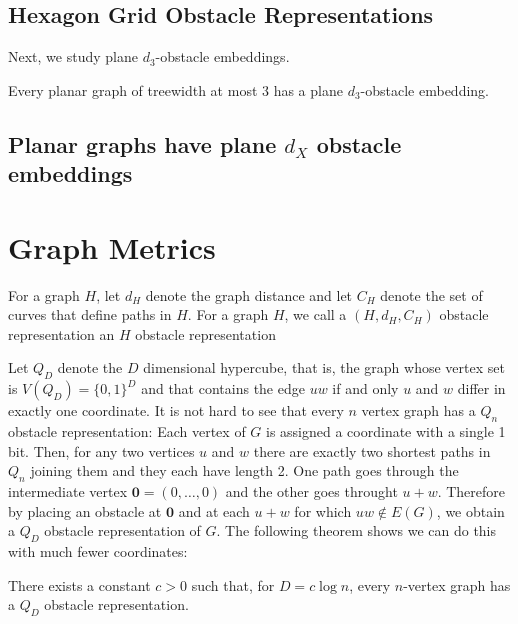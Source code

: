 \documentclass{patmorin}
\begin{document}
\subsection{Hexagon Grid Obstacle Representations}
 
Next, we study plane $d_3$-obstacle embeddings.

\begin{thm}
  Every planar graph of treewidth at most 3 has a plane $d_3$-obstacle embedding.   
\end{thm}

\subsection{Planar graphs have plane $d_{X}$ obstacle embeddings}

\section{Graph Metrics}

For a graph $H$, let $d_H$ denote the graph distance and let $C_H$ denote
the set of curves that define paths in $H$.  For a graph $H$, we call
a $(H,d_H,C_H)$ obstacle representation an $H$ obstacle representation

Let $Q_D$ denote the $D$ dimensional hypercube, that is, the graph whose vertex set is $V(Q_D)=\{0,1\}^D$ and that contains the edge $uw$ if and only $u$
and $w$ differ in exactly one coordinate.  It is not hard to see
that every $n$ vertex graph has a $Q_n$ obstacle representation: Each vertex of $G$ is assigned a coordinate with a single 1 bit.  Then, for any two vertices $u$ and $w$ there are exactly two shortest paths in $Q_n$ joining them and they each have length 2.  One path goes through the intermediate vertex $\mathbf{0}=(0,\ldots,0)$ and the other goes throught $u+w$.  Therefore by placing an obstacle at $\mathbf{0}$ and at each $u+w$ for which $uw\not\in E(G)$, we obtain a $Q_D$ obstacle representation of $G$.  The following theorem shows we can do this with much fewer coordinates:

\begin{thm}
  There exists a constant $c>0$ such that, for $D=c\log n$, every $n$-vertex graph has a $Q_D$ obstacle representation.
\end{thm}
\end{document}
